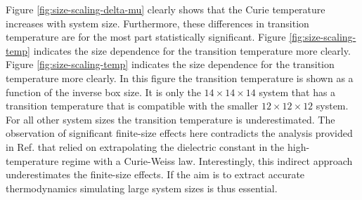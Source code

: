 Figure \ref{fig:size-scaling-delta-mu} clearly shows that the Curie temperature increases with system size.  Furthermore, these differences in transition temperature are for the most part statistically significant.  Figure \ref{fig:size-scaling-temp} indicates the size dependence for the transition temperature more clearly.  Figure \ref{fig:size-scaling-temp} indicates the size dependence for the transition temperature more clearly. In this figure the transition temperature is shown as a function of the inverse box size.  It is only the $14\times14\times14$ system that has a transition temperature that is compatible with the smaller  $12\times12\times12$ system.  For all other system sizes the transition temperature is  underestimated. The observation of significant finite-size effects here contradicts the analysis provided in Ref. \cite{gigli_thermodynamics_2022} that relied on extrapolating the dielectric constant in the high-temperature regime with a Curie-Weiss law. Interestingly, this indirect approach underestimates the finite-size effects. If the aim is to extract accurate thermodynamics simulating large system sizes is thus essential.




